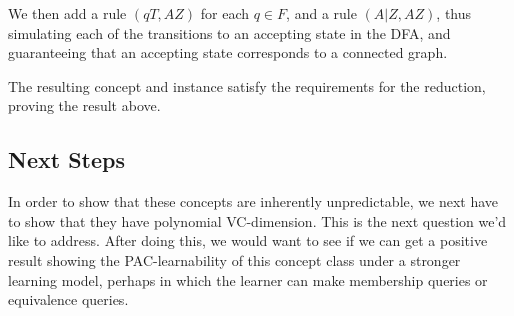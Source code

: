 \documentclass[]{article}
\begin{document}
We then add a rule $(qT, AZ)$ for each $q\in F$, and a rule $(A|Z,AZ)$, thus
simulating each of the transitions to an accepting state in the DFA, and
guaranteeing that an accepting state corresponds to a connected graph.

The resulting concept and instance satisfy the requirements for the reduction,
proving the result above.

\subsection{Next Steps}

In order to show that these concepts are inherently unpredictable, we next have
to show that they have polynomial VC-dimension. This is the next question we'd
like to address. After doing this, we would want to see if we can get a positive
result showing the PAC-learnability of this concept class under a stronger
learning model, perhaps in which the learner can make membership queries or
equivalence queries.




\end{document}
